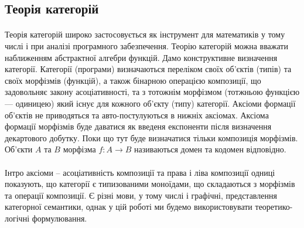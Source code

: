 \documentclass[9pt]{memoir}
\begin{document}
\subsection{Теорія категорій}

    \paragraph{}
    Теорія категорій широко застосовується як інструмент для математиків у тому числі і
    при аналізі програмного забезпечення. Теорію категорій можна вважати наближенням абстрактної алгебри функцій.
    Дамо конструктивне визначення категорії.
    Категорії (програми) визначаються переліком своїх об’єктів (типів) та своїх
    морфізмів (функцій), а також бінарною операцією композиції,
    що задовольняє закону асоціативності, та з тотожнім морфізмом (тотжньою функцією --- одиницею) який існує
    для кожного об’єкту (типу) категорії. Аксіоми формації об’єктів не
    приводяться та авто-постулуються в нижніх аксіомах. Аксіома формації
    морфізмів буде даватися як введеня експоненти після визначення декартового добутку.
    Поки що тут буде визначатися тільки композиція морфізмів. Об’єкти $A$ та $B$ морфізма $f: A \rightarrow B$
    називаються домен та кодомен відповідно.

    \paragraph{}
    Інтро аксіоми -- асоціативність композиції та права і ліва композиції одниці показують,
    що категорії є типизованими моноїдами, що складаються з морфізмів та операції композиції.
    Є різні мови, у тому числі і графічні, представлення категорної семантики, однак у цій роботі
    ми будемо використовувати теоретико-логічні формулювання.
\end{document}
